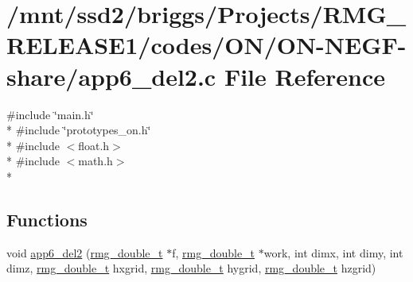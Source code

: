 \hypertarget{_o_n_2_o_n-_n_e_g_f-share_2app6__del2_8c}{\section{/mnt/ssd2/briggs/\-Projects/\-R\-M\-G\-\_\-\-R\-E\-L\-E\-A\-S\-E1/codes/\-O\-N/\-O\-N-\/\-N\-E\-G\-F-\/share/app6\-\_\-del2.c File Reference}
\label{_o_n_2_o_n-_n_e_g_f-share_2app6__del2_8c}
}
{\ttfamily \#include \char`\"{}main.\-h\char`\"{}}\\*
{\ttfamily \#include \char`\"{}prototypes\-\_\-on.\-h\char`\"{}}\\*
{\ttfamily \#include $<$float.\-h$>$}\\*
{\ttfamily \#include $<$math.\-h$>$}\\*
\subsection*{Functions}
\begin{DoxyCompactItemize}
\item 
void \hyperlink{_o_n_2_o_n-_n_e_g_f-share_2app6__del2_8c_acb586023654206234f08e39450d9dcba}{app6\-\_\-del2} (\hyperlink{rmgtypes_8h_aaa16921c14f121c56eaa42390a340db8}{rmg\-\_\-double\-\_\-t} $\ast$f, \hyperlink{rmgtypes_8h_aaa16921c14f121c56eaa42390a340db8}{rmg\-\_\-double\-\_\-t} $\ast$work, int dimx, int dimy, int dimz, \hyperlink{rmgtypes_8h_aaa16921c14f121c56eaa42390a340db8}{rmg\-\_\-double\-\_\-t} hxgrid, \hyperlink{rmgtypes_8h_aaa16921c14f121c56eaa42390a340db8}{rmg\-\_\-double\-\_\-t} hygrid, \hyperlink{rmgtypes_8h_aaa16921c14f121c56eaa42390a340db8}{rmg\-\_\-double\-\_\-t} hzgrid)
\end{DoxyCompactItemize}



